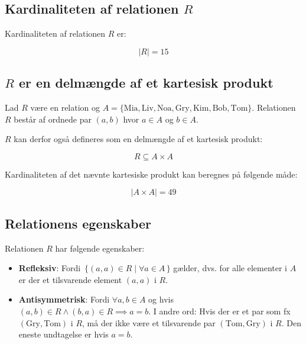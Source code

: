 \subsection{Kardinaliteten af relationen \(R\)}\label{subsec:kardinaliteten-af-relationen-(r)}

Kardinaliteten af relationen \(R\) er:

\begin{equation}
    |R| = 15\label{eq:equation5}
\end{equation}

\subsection{\(R\) er en delmængde af et kartesisk produkt}\label{subsec:(r)-er-en-delmngde-af-et-kartesisk-produkt}

Lad \(R\) være en relation og \(A = \{\text{Mia}, \text{Liv}, \text{Noa}, \text{Gry}, \text{Kim}, \text{Bob},
\text{Tom}\}\).
Relationen \(R\) består af ordnede par \((a, b)\) hvor \(a \in A\) og \(b \in A\).

\(R\) kan derfor også defineres som en delmængde af et kartesisk produkt:

\begin{equation}
    R \subseteq A \times A\label{eq:equation3}
\end{equation}

Kardinaliteten af det nævnte kartesiske produkt kan beregnes på følgende måde:

\begin{equation}
    | A \times A | = 49\label{eq:equation4}
\end{equation}

\subsection{Relationens egenskaber}\label{subsec:relationens-egenskaber}

Relationen \(R\) har følgende egenskaber:

\begin{itemize}
    \item \textbf{Refleksiv}: Fordi \(\,\{(a, a) \in R \mid \forall a \in A\,\}\) gælder, dvs.
    for alle elementer i \(A\) er der et tilsvarende element \((a, a)\) i \(R\).
    \item \textbf{Antisymmetrisk}: Fordi \(\forall a, b \in A \) og hvis
    \((a, b) \in R \land (b, a) \in R \implies a = b\).
    I andre ord: Hvis der er et par som fx \((\text{Gry}, \text{Tom})\) i \(R\), må der ikke være et tilsvarende par
    \((\text{Tom}, \text{Gry})\) i \(R\).
    Den eneste undtagelse er hvis \(a = b\).
\end{itemize}

